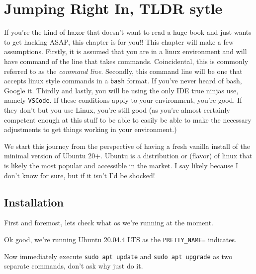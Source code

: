 \chapter{Jumping Right In, TLDR sytle}
If you're the kind of haxor that doesn't want to read a huge book and just wants to get hacking ASAP, this chapter is for you!! This chapter will make a few assumptions. Firstly, it is assumed that you are in a linux environment and will have command of the line that takes commands. Coincidental, this is commonly referred to as the \emph{command line}. Secondly, this command line will be one that accepts linux style commands in a \texttt{bash} format. If you've never heard of bash, Google it. Thirdly and lastly, you will be using the only IDE true ninjas use, namely \texttt{VSCode}. If these conditions apply to your environment, you're good. If they don't but you use Linux, you're still good (as you're almost certainly competent enough at this stuff to be able to easily be able to make the necessary adjustments to get things working in your environment.)

We start this journey from the perspective of having a fresh vanilla install of the minimal version of Ubuntu 20+. Ubuntu is a distribution or (flavor) of linux that is likely the most popular and accessible in the market. I say likely because I don't know for sure, but if it isn't I'd be shocked!

\section{Installation}
First and foremost, lets check what os we're running at the moment.
\par
{}
Ok good, we're running Ubuntu 20.04.4 LTS as the \texttt{PRETTY\_NAME=} indicates.

Now immediately execute \texttt{sudo apt update} and \texttt{sudo apt upgrade} as two separate commands, don't ask why just do it.

